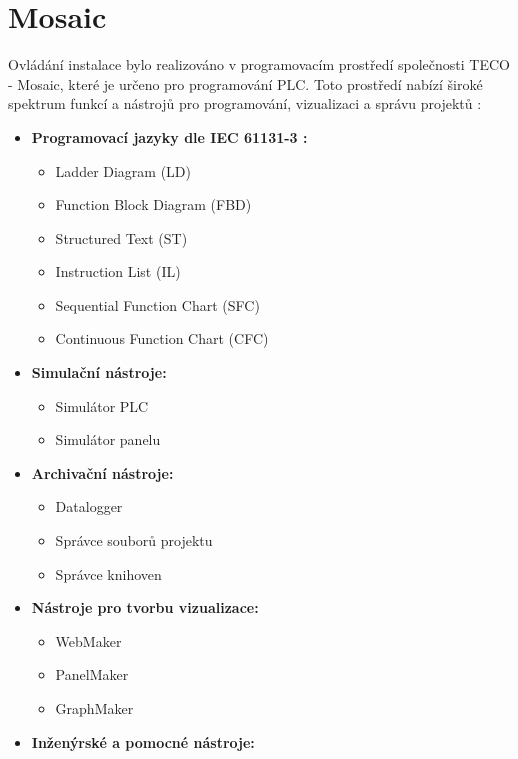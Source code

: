 \section{Mosaic}
Ovládání instalace bylo realizováno v programovacím prostředí společnosti TECO - Mosaic, které je určeno pro programování PLC. Toto prostředí nabízí široké spektrum funkcí a nástrojů pro programování, vizualizaci a správu projektů \cite{Mosaic}: 

\begin{itemize}
    \item \textbf{Programovací jazyky dle IEC 61131-3 \cite{IEC61131-3}:}
        \begin{itemize}
            \item Ladder Diagram (LD)
            \item Function Block Diagram (FBD)
            \item Structured Text (ST)
            \item Instruction List (IL)
            \item Sequential Function Chart (SFC)
            \item Continuous Function Chart (CFC)
        \end{itemize}
    \item \textbf{Simulační nástroje:}
        \begin{itemize}
            \item Simulátor PLC
            \item Simulátor panelu
        \end{itemize}
    \item \textbf{Archivační nástroje:}
        \begin{itemize}
            \item Datalogger
            \item Správce souborů projektu
            \item Správce knihoven
        \end{itemize}
    \item \textbf{Nástroje pro tvorbu vizualizace:}
        \begin{itemize}
            \item WebMaker
            \item PanelMaker
            \item GraphMaker
        \end{itemize}
    \item \textbf{Inženýrské a pomocné nástroje:}
        \begin{itemize}

\end{itemize}
\end{itemize}
